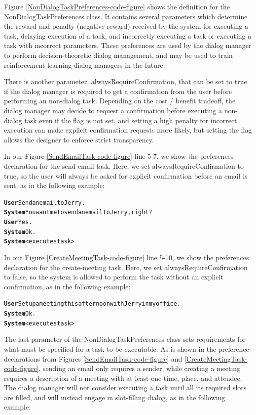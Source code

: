 \documentclass[10pt]{article}
\begin{document}
Figure \ref{NonDialogTaskPreferences-code-figure} shows the definition for the NonDialogTaskPreferences class.
It contains several parameters which determine the reward and penalty (negative reward) received by the system for executing a task, delaying execution of a task, and incorrectly executing a task or executing a task with incorrect parameters.
These preferences are used by the dialog manager to perform decision-theoretic dialog management, and may be used to train reinforcement-learning dialog managers in the future.

There is another parameter, alwaysRequireConfirmation, that can be set to true if the dialog manager is required to get a confirmation from the user before performing an non-dialog task.
Depending on the cost / benefit tradeoff, the dialog manager may decide to request a confirmation before executing a non-dialog task even if the flag is not set, and setting a high penalty for incorrect execution can make explicit confirmation requests more likely, but setting the flag allows the designer to enforce strict transparency.

In our Figure \ref{SendEmailTask-code-figure} line 5-7, we show the preferences declaration for the send-email task.
Here, we set alwaysRequireConfirmation to true, so the user will always be asked for explicit confirmation before an email is sent, as in the following example:

\begin{alltt}
\textbf{User} Send an email to Jerry.
\textbf{System} You want me to send an email to Jerry, right?
\textbf{User} Yes.
\textbf{System} Ok.
\textbf{System} <executes task>
\end{alltt}

In our Figure \ref{CreateMeetingTask-code-figure} line 5-10, we show the preferences declaration for the create-meeting task.
Here, we set alwaysRequireConfirmation to false, so the system is allowed to perform the task without an explicit confirmation, as in the following example:

\begin{alltt}
\textbf{User} Set up a meeting this afternoon with Jerry in my office.
\textbf{System} Ok.
\textbf{System} <executes task>
\end{alltt}

The last parameter of the NonDialogTaskPreferences class sets requirements for what must be specified for a task to be executable.
As is shown in the preference declarations from Figures \ref{SendEmailTask-code-figure} and \ref{CreateMeetingTask-code-figure}, sending an email only requires a sender, while creating a meeting requires a description of a meeting with at least one time, place, and attendee.
The dialog manager will not consider executing a task until all its required slots are filled, and will instead engage in slot-filling dialog, as in the following example:
\end{document}
